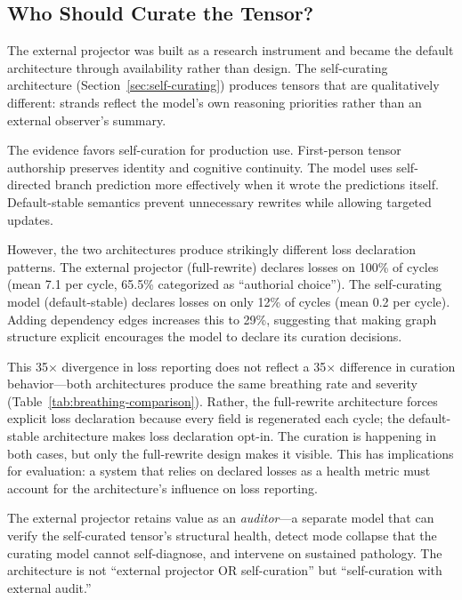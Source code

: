 
\subsection{Who Should Curate the Tensor?}

The external projector was built as a research instrument and became the
default architecture through availability rather than design. The self-curating
architecture (Section~\ref{sec:self-curating}) produces tensors that are
qualitatively different: strands reflect the model's own reasoning priorities
rather than an external observer's summary.

The evidence favors self-curation for production use. First-person tensor
authorship preserves identity and cognitive continuity. The model uses
self-directed branch prediction more effectively when it wrote the
predictions itself. Default-stable semantics prevent unnecessary rewrites
while allowing targeted updates.

However, the two architectures produce strikingly different loss
declaration patterns. The external projector (full-rewrite) declares
losses on 100\% of cycles (mean 7.1 per cycle, 65.5\% categorized as
``authorial choice''). The self-curating model (default-stable) declares
losses on only 12\% of cycles (mean 0.2 per cycle). Adding dependency
edges increases this to 29\%, suggesting that making graph structure
explicit encourages the model to declare its curation decisions.

This 35$\times$ divergence in loss reporting does not reflect a 35$\times$
difference in curation behavior---both architectures produce the same
breathing rate and severity (Table~\ref{tab:breathing-comparison}). Rather,
the full-rewrite architecture forces explicit loss declaration because
every field is regenerated each cycle; the default-stable architecture makes
loss declaration opt-in. The curation is happening in both cases, but only
the full-rewrite design makes it visible. This has implications for
evaluation: a system that relies on declared losses as a health metric must
account for the architecture's influence on loss reporting.

The external projector retains value as an \emph{auditor}---a separate
model that can verify the self-curated tensor's structural health,
detect mode collapse that the curating model cannot self-diagnose, and
intervene on sustained pathology. The architecture is not ``external
projector OR self-curation'' but ``self-curation with external audit.''

